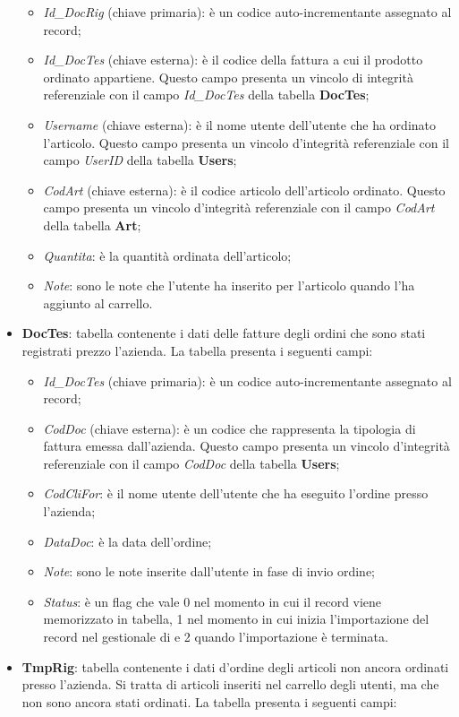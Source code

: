 \begin{itemize}
\begin{itemize}
			\item \textit{Id\_DocRig} (chiave primaria): è un codice auto-incrementante assegnato al record; 
			\item \textit{Id\_DocTes} (chiave esterna): è il codice della fattura a cui il prodotto ordinato appartiene. Questo campo presenta un vincolo di integrità referenziale con il campo \textit{Id\_DocTes} della tabella \textbf{DocTes};
			\item \textit{Username} (chiave esterna): è il nome utente dell'utente che ha ordinato l'articolo. Questo campo presenta un vincolo d'integrità referenziale con il campo \textit{UserID} della tabella \textbf{Users};
			\item \textit{CodArt} (chiave esterna): è il codice articolo dell'articolo ordinato. Questo campo presenta un vincolo d'integrità referenziale con il campo \textit{CodArt} della tabella \textbf{Art};
			\item \textit{Quantita}: è la quantità ordinata dell'articolo;
			\item \textit{Note}: sono le note che l'utente ha inserito per l'articolo quando l'ha aggiunto al carrello.
		\end{itemize}
	\item \textbf{DocTes}: tabella contenente i dati delle fatture degli ordini che sono stati registrati prezzo l'azienda. La tabella presenta i seguenti campi:
		\begin{itemize}
			\item \textit{Id\_DocTes} (chiave primaria): è un codice auto-incrementante assegnato al record;
			\item \textit{CodDoc} (chiave esterna): è un codice che rappresenta la tipologia di fattura emessa dall'azienda. Questo campo presenta un vincolo d'integrità referenziale con il campo \textit{CodDoc} della tabella \textbf{Users};
			\item \textit{CodCliFor}: è il nome utente dell'utente che ha eseguito l'ordine presso l'azienda;
			\item \textit{DataDoc}: è la data dell'ordine;
			\item \textit{Note}: sono le note inserite dall'utente in fase di invio ordine;
			\item \textit{Status}: è un flag che vale 0 nel momento in cui il record viene memorizzato in tabella, 1 nel momento in cui inizia l'importazione del record nel gestionale di \visione{} e 2 quando l'importazione è terminata.
		\end{itemize}
	\item \textbf{TmpRig}: tabella contenente i dati d'ordine degli articoli non ancora ordinati presso l'azienda. Si tratta di articoli inseriti nel carrello degli utenti, ma che non sono ancora stati ordinati. La tabella presenta i seguenti campi:

\end{itemize}
